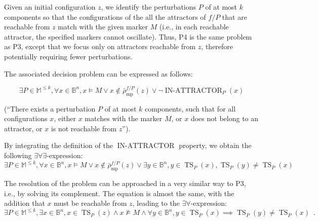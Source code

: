 \documentclass[PCJ,Unicode,screen,mode=plain]{cedram}
\begin{document}
Given an initial configuration \(z\), we identify the perturbations
\(P\) of at most \(k\) components so that the configurations of the all
the attractors of \(f/P\) that are reachable from \(z\) match with the
given marker \(M\) (i.e., in each reachable attractor, the specified
markers cannot oscillate). Thus, P4 is the same problem as P3, except
that we focus only on attractors reachable from \(z\), therefore
potentially requiring fewer perturbations.

The associated decision problem can be expressed as follows:

\begin{equation}
    \exists P\in\mathbb M^{\leq k}, \forall x\in\mathbb B^n, x\models M \vee x\notin\bar\rho^{f/P}_{\mathrm{mp}}(z)  \vee \neg\operatorname{IN-ATTRACTOR}_P(x)
\end{equation}

(``There exists a perturbation \(P\) of at most \(k\) components, such
that for all configurations \(x\), either \(x\) matches with the marker
\(M\), or \(x\) does not belong to an attractor, or \(x\) is not
reachable from \(z\)'').

By integrating the definition of the \(\operatorname{IN-ATTRACTOR}\)
property, we obtain the following \(\exists\forall\exists\)-expression:
\begin{equation}
    \exists P\in\mathbb M^{\leq k}, \forall x\in\mathbb B^n, x\models M \vee x\notin\bar\rho^{f/P}_{\mathrm{mp}}(z) \vee \exists y\in\mathbb B^n,
   y\in \operatorname{TS}_P(x), \operatorname{TS}_P(y) \neq \operatorname{TS}_P(x)
\end{equation}

The resolution of the problem can be approached in a very similar way to
P3, i.e., by solving its complement. The equation is almost the same,
with the addition that \(x\) must be reachable from \(z\), leading to
the \(\exists\forall\)-expression: \begin{equation}
    \exists P\in\mathbb M^{\leq k}, \exists x\in\mathbb B^n, x\in\operatorname{TS}_P(z) \wedge x\not\models M\wedge \forall y\in\mathbb B^n, y\in \operatorname{TS}_P(x) \implies \operatorname{TS}_P(y) \neq \operatorname{TS}_P(x)
\enspace.
\end{equation}
\end{document}
